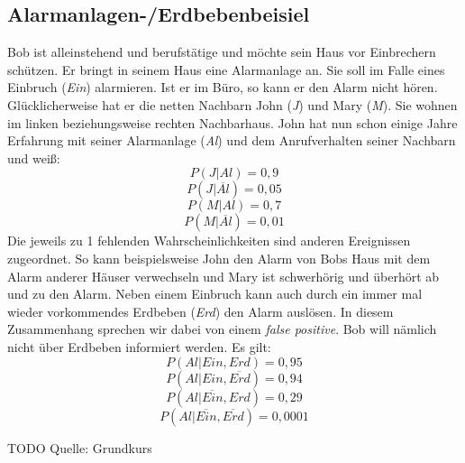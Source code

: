 \subsection{Alarmanlagen-/Erdbebenbeisiel}
Bob ist alleinstehend und berufstätige und möchte sein Haus vor Einbrechern schützen. Er bringt in seinem Haus eine Alarmanlage an. Sie soll im Falle eines Einbruch (\textit{Ein}) alarmieren. Ist er im Büro, so kann er den Alarm nicht hören. Glücklicherweise hat er die netten Nachbarn John (\textit{J}) und Mary (\textit{M}). Sie wohnen im linken beziehungsweise rechten Nachbarhaus. John hat nun schon einige Jahre Erfahrung mit seiner Alarmanlage (\textit{Al}) und dem Anrufverhalten seiner Nachbarn und weiß: 
\[ P(J\vert Al) = 0,9\] 
\[ P(J\vert \overline{Al}) = 0,05\]
\[ P(M\vert Al) = 0,7\]
\[ P(M\vert \overline{Al} ) = 0,01\]
Die jeweils zu 1 fehlenden Wahrscheinlichkeiten sind anderen Ereignissen zugeordnet. So kann beispielsweise John den Alarm von Bobs Haus mit dem Alarm anderer Häuser verwechseln und Mary ist schwerhörig und überhört ab und zu den Alarm. 
Neben einem Einbruch kann auch durch ein immer mal wieder vorkommendes Erdbeben (\textit{Erd}) den Alarm auslösen. In diesem Zusammenhang sprechen wir dabei von einem \textit{false positive}. Bob will nämlich nicht über Erdbeben informiert werden. Es gilt:
\[ P(Al\vert Ein, Erd) = 0,95\] 
\[ P(Al\vert Ein,\overline{Erd}) = 0,94\]
\[ P(Al\vert \overline{Ein}, Erd) = 0,29\]
\[ P(Al\vert \overline{Ein}, \overline{Erd})  = 0,0001\]






TODO Quelle: Grundkurs

